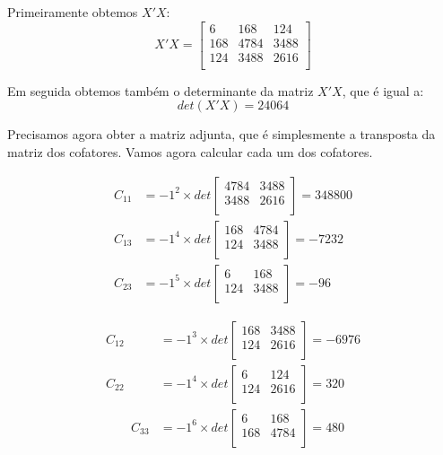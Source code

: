 \documentclass[]{ufpe-exercises}
\begin{document}
\begin{questions}
\begin{parts}
\begin{solution}
			Primeiramente obtemos \(X'X\):
			\[
				X'X =
				\begin{bmatrix}
					6   & 168  & 124  \\
					168 & 4784 & 3488 \\
					124 & 3488 & 2616 \\
				\end{bmatrix}
			\]

			Em seguida obtemos também o determinante da matriz \(X'X\), que é igual a:
			\[det(X'X) = 24064\]

			Precisamos agora obter a matriz adjunta, que é simplesmente a transposta da matriz dos cofatores. Vamos agora calcular cada um dos cofatores.

			\begin{minipage}[t]{0.49\textwidth}
				\begin{align*}
					C_{11} & = -1^{2} \times det
					\begin{bmatrix}
						4784 & 3488 \\
						3488 & 2616 \\
					\end{bmatrix}
					= 348800
					\\
					C_{13} & = -1^{4} \times det
					\begin{bmatrix}
						168 & 4784 \\
						124 & 3488 \\
					\end{bmatrix}
					= -7232
					\\
					C_{23} & = -1^{5} \times det
					\begin{bmatrix}
						6   & 168  \\
						124 & 3488 \\
					\end{bmatrix}
					= -96
				\end{align*}
			\end{minipage}
			\hfill %
			\begin{minipage}[t]{0.49\textwidth}
				\begin{align*}
					C_{12} & = -1^{3} \times det
					\begin{bmatrix}
						168 & 3488 \\
						124 & 2616 \\
					\end{bmatrix}
					= -6976
					\\
					C_{22} & = -1^{4} \times det
					\begin{bmatrix}
						6   & 124  \\
						124 & 2616 \\
					\end{bmatrix}
					= 320
					\\
					\qquad
					C_{33} & = -1^{6} \times det
					\begin{bmatrix}
						6   & 168  \\
						168 & 4784 \\
					\end{bmatrix}
					= 480
				\end{align*}
			\end{minipage}


\end{solution}
\end{parts}
\end{questions}
\end{document}
